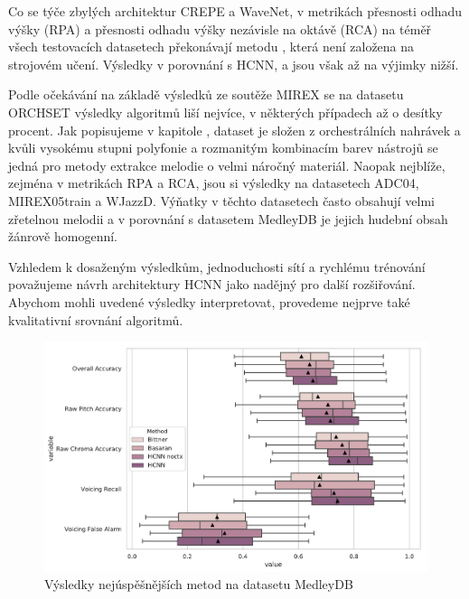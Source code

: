 Co se týče zbylých architektur CREPE a WaveNet, v metrikách přesnosti odhadu výšky (RPA) a přesnosti odhadu výšky nezávisle na oktávě (RCA) na téměř všech testovacích datasetech překonávají metodu \cite{Salamon2012a}, která není založena na strojovém učení. Výsledky v porovnání s HCNN, \cite{Bittner2017} a \cite{DBasaranSEssid2018} jsou však až na výjimky nižší.

Podle očekávání na základě výsledků ze soutěže MIREX se na datasetu ORCHSET výsledky algoritmů liší nejvíce, v některých případech až o desítky procent. Jak popisujeme v kapitole , dataset je složen z orchestrálních nahrávek a kvůli vysokému stupni polyfonie a rozmanitým kombinacím barev nástrojů se jedná pro metody extrakce melodie o velmi náročný materiál. Naopak nejblíže, zejména v metrikách RPA a RCA, jsou si výsledky na datasetech ADC04, MIREX05train a WJazzD. Výňatky v těchto datasetech často obsahují velmi zřetelnou melodii a v porovnání s datasetem MedleyDB je jejich hudební obsah žánrově homogenní.

Vzhledem k dosaženým výsledkům, jednoduchosti sítí a rychlému trénování považujeme návrh architektury HCNN jako nadějný pro další rozšiřování. Abychom mohli uvedené výsledky interpretovat, provedeme nejprve také kvalitativní srovnání algoritmů. 


\begin{figure}[h]\centering
\includegraphics[width=\textwidth,height=\textheight,keepaspectratio]{../img/final_medleydb}
\caption{Výsledky nejúspěšnějších metod na datasetu MedleyDB}
\label{obr:final_medleydb}
\end{figure}

